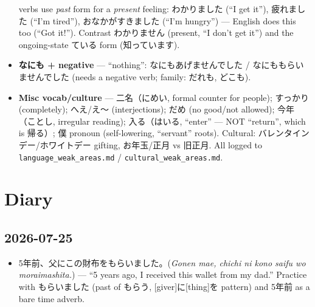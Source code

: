 \documentclass[11pt]{article}
\begin{document}
\begin{CJK}{UTF8}{min}
\begin{itemize}
        verbs use \emph{past} form for a \emph{present} feeling: わかりました
        (``I get it''), 疲れました (``I'm tired''), おなかがすきました (``I'm hungry'')
        --- English does this too (``Got it!''). Contrast わかりません (present,
        ``I don't get it'') and the ongoing-state ている form (知っています).
  \item \textbf{\texorpdfstring{なにも}{nanimo} + negative} --- ``nothing'':
        なにもあげませんでした / なにももらいませんでした (needs a negative verb;
        family: だれも, どこも).
  \item \textbf{Misc vocab/culture} --- 二名（にめい, formal counter for people);
        すっかり (completely); へえ/え〜 (interjections); だめ (no good/not allowed);
        今年（ことし, irregular reading); 入る（はいる, ``enter'' --- NOT ``return'',
        which is 帰る）; 僕 pronoun (self-lowering, ``servant'' roots).
        Cultural: バレンタインデー/ホワイトデー gifting, お年玉/正月 vs 旧正月.
        All logged to \texttt{language\_weak\_areas.md} /
        \texttt{cultural\_weak\_areas.md}.
\end{itemize}

\section{Diary}

\subsection{2026-07-25}
\begin{itemize}
  \item 5年前、父にこの財布をもらいました。(\emph{Gonen mae, chichi ni kono
        saifu wo moraimashita.}) --- ``5 years ago, I received this wallet
        from my dad.'' Practice with もらいました (past of もらう,
        [giver]に[thing]を pattern) and 5年前 as a bare time adverb.
\end{itemize}

\printbibliography

\end{CJK}
\end{document}
